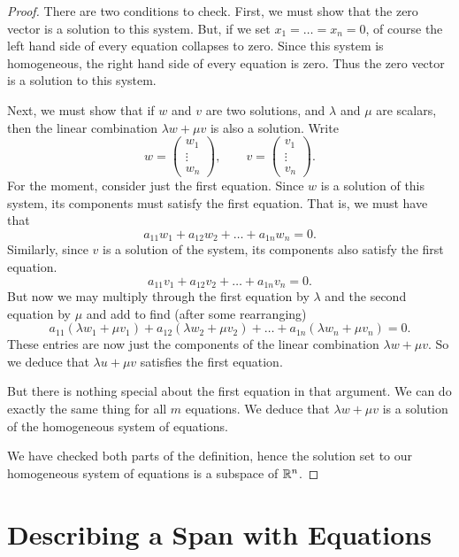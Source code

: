 \documentclass[00-livre-main.tex]{subfiles}
\begin{document}
\begin{proof}
There are two conditions to check. First, we must show that the zero vector is a solution to this system. But, if we set $x_1=\dots=x_n=0$, of course the left hand side of every equation collapses to zero. Since this system is homogeneous, the right hand side of every equation is zero. Thus the zero vector is a solution to this system.

Next, we must show that if $w$ and $v$ are two solutions, and $\lambda$ and $\mu$ are scalars, then the linear combination $\lambda w + \mu v$ is also a solution. Write
\[
w = \begin{pmatrix} w_1 \\ \vdots \\ w_n \end{pmatrix}, \qquad 
v = \begin{pmatrix} v_1 \\ \vdots \\ v_n \end{pmatrix}.
\]
For the moment, consider just the first equation. Since $w$ is a solution of this system, its components must satisfy the first equation. That is, we must have that 
\[
a_{11}w_1  +  a_{12} w_2  +  \dots  +  a_{1n}w_n  =  0.
\]
Similarly, since $v$ is a solution of the system, its components also satisfy the first equation.
\[
a_{11}v_1  +  a_{12} v_2  +  \dots  +  a_{1n}v_n  =  0.
\]
But now we may multiply through the first equation by $\lambda$ and the second equation by $\mu$ and add to find (after some rearranging)
\[
a_{11}(\lambda w_1 +\mu v_1)  +  a_{12} (\lambda w_2 +\mu v_2)  +  \dots  +  a_{1n}(\lambda w_n +\mu v_n)  =  0.
\]
These entries are now just the components of the linear combination $\lambda w + \mu v$. So we deduce that $\lambda u + \mu v$ satisfies the first equation.

But there is nothing special about the first equation in that argument. We can do exactly the same thing for all $m$ equations. We deduce that $\lambda w + \mu v$ is a solution of the homogeneous system of equations.

We have checked both parts of the definition, hence the solution set to our homogeneous system of equations is a subspace of $\mathbb{R}^n$.
\end{proof}

\section*{Describing a Span with Equations}
\end{document}

